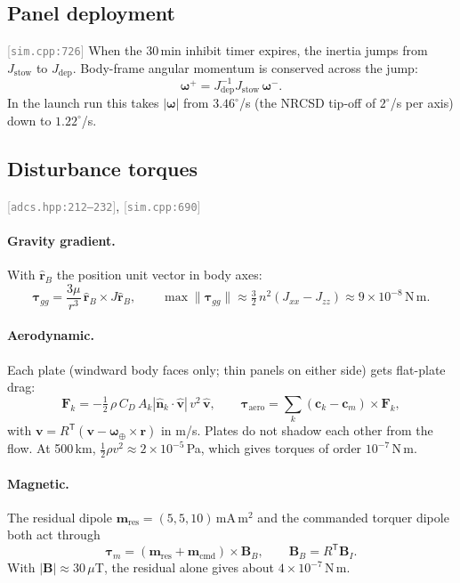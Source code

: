 \documentclass[11pt,a4paper]{article}
\newcommand{\vb}[1]{\boldsymbol{#1}}
\newcommand{\uv}[1]{\hat{\boldsymbol{#1}}}
\newcommand{\src}[1]{\textcolor{gray}{\small[\texttt{#1}]}}
\newcommand{\tp}{^{\mathsf{T}}}
\begin{document}
\subsection{Panel deployment} \src{sim.cpp:726}
When the 30\,min inhibit timer expires, the inertia jumps from $J_{\text{stow}}$ to $J_{\text{dep}}$. Body-frame angular momentum is conserved across the jump:
\begin{equation}
\vb\omega^+ = J_{\text{dep}}^{-1}J_{\text{stow}}\,\vb\omega^- .
\end{equation}
In the launch run this takes $|\vb\omega|$ from $3.46^\circ$/s (the NRCSD tip-off of $2^\circ$/s per axis) down to $1.22^\circ$/s.

\subsection{Disturbance torques} \src{adcs.hpp:212--232}, \src{sim.cpp:690}
\paragraph{Gravity gradient.} With $\uv r_B$ the position unit vector in body axes:
\begin{equation}
\vb\tau_{gg} = \frac{3\mu}{r^3}\,\uv r_B\times J\uv r_B,\qquad
\max\lVert\vb\tau_{gg}\rVert \approx \tfrac32\, n^2 (J_{xx}-J_{zz}) \approx 9\times10^{-8}\,\mathrm{N\,m}.
\end{equation}
\paragraph{Aerodynamic.} Each plate (windward body faces only; thin panels on either side) gets flat-plate drag:
\begin{equation}
\vb F_k = -\tfrac12\,\rho\,C_D\,A_k|\uv n_k\cdot\uv v|\,v^2\,\uv v,\qquad
\vb\tau_{\text{aero}} = \sum_k (\vb c_k - \vb c_m)\times\vb F_k,
\end{equation}
with $\vb v = R\tp(\vb v - \vb\omega_\oplus\times\vb r)$ in m/s. Plates do not shadow each other from the flow. At 500\,km, $\tfrac12\rho v^2 \approx 2\times10^{-5}$\,Pa, which gives torques of order $10^{-7}$\,N\,m.
\paragraph{Magnetic.} The residual dipole $\vb m_{\text{res}} = (5, 5, 10)$\,mA\,m$^2$ and the commanded torquer dipole both act through
\begin{equation}
\vb\tau_m = (\vb m_{\text{res}} + \vb m_{\text{cmd}})\times\vb B_B,\qquad \vb B_B = R\tp\vb B_I .
\end{equation}
With $|\vb B| \approx 30\,\mu$T, the residual alone gives about $4\times10^{-7}$\,N\,m.
\end{document}
